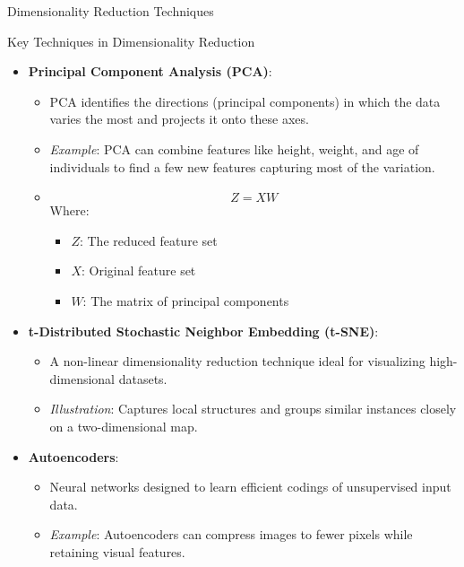\documentclass[aspectratio=169]{beamer}
\begin{document}
\begin{frame}[fragile]{Dimensionality Reduction Techniques}
    \begin{block}{Key Techniques in Dimensionality Reduction}
        \begin{itemize}
            \item \textbf{Principal Component Analysis (PCA)}: 
            \begin{itemize}
                \item PCA identifies the directions (principal components) in which the data varies the most and projects it onto these axes.
                \item \textit{Example}: PCA can combine features like height, weight, and age of individuals to find a few new features capturing most of the variation.
                \item 
                \begin{equation}
                    Z = XW
                \end{equation}
                Where:
                \begin{itemize}
                    \item \( Z \): The reduced feature set
                    \item \( X \): Original feature set
                    \item \( W \): The matrix of principal components
                \end{itemize}
            \end{itemize}
            
            \item \textbf{t-Distributed Stochastic Neighbor Embedding (t-SNE)}: 
            \begin{itemize}
                \item A non-linear dimensionality reduction technique ideal for visualizing high-dimensional datasets.
                \item \textit{Illustration}: Captures local structures and groups similar instances closely on a two-dimensional map.
            \end{itemize}

            \item \textbf{Autoencoders}: 
            \begin{itemize}
                \item Neural networks designed to learn efficient codings of unsupervised input data.
                \item \textit{Example}: Autoencoders can compress images to fewer pixels while retaining visual features.
            \end{itemize}
        \end{itemize}
    \end{block}
\end{frame}
\end{document}
